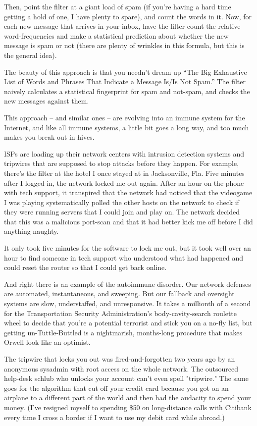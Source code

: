 Then, point the filter at a giant load of spam (if you’re having a
hard time getting a hold of one, I have plenty to spare), and count
the words in it. Now, for each new message that arrives in your
inbox, have the filter count the relative word-frequencies and make
a statistical prediction about whether the new message is spam or
not (there are plenty of wrinkles in this formula, but this is the
general idea).

The beauty of this approach is that you needn’t dream up “The Big
Exhaustive List of Words and Phrases That Indicate a Message Is/Is
Not Spam.” The filter naively calculates a statistical fingerprint
for spam and not-spam, and checks the new messages against them.

This approach -- and similar ones -- are evolving into an immune
system for the Internet, and like all immune systems, a little bit
goes a long way, and too much makes you break out in hives.

ISPs are loading up their network centers with intrusion detection
systems and tripwires that are supposed to stop attacks before they
happen. For example, there’s the filter at the hotel I once stayed
at in Jacksonville, Fla. Five minutes after I logged in, the
network locked me out again. After an hour on the phone with tech
support, it transpired that the network had noticed that the
videogame I was playing systematically polled the other hosts on
the network to check if they were running servers that I could join
and play on. The network decided that this was a malicious
port-scan and that it had better kick me off before I did anything
naughty.

It only took five minutes for the software to lock me out, but it
took well over an hour to find someone in tech support who
understood what had happened and could reset the router so that I
could get back online.

And right there is an example of the autoimmune disorder. Our
network defenses are automated, instantaneous, and sweeping. But
our fallback and oversight systems are slow, understaffed, and
unresponsive. It takes a millionth of a second for the
Transportation Security Administration’s body-cavity-search
roulette wheel to decide that you’re a potential terrorist and
stick you on a no-fly list, but getting un-Tuttle-Buttled is a
nightmarish, months-long procedure that makes Orwell look like an
optimist.

The tripwire that locks you out was fired-and-forgotten two years
ago by an anonymous sysadmin with root access on the whole network.
The outsourced help-desk schlub who unlocks your account can’t even
spell "tripwire." The same goes for the algorithm that cut off your
credit card because you got on an airplane to a different part of
the world and then had the audacity to spend your money. (I’ve
resigned myself to spending \$50 on long-distance calls with
Citibank every time I cross a border if I want to use my debit card
while abroad.)

